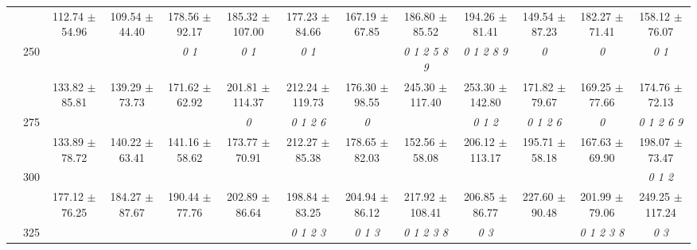 \begin{table}[h]
{\begin{tabular}{
        ccccccccccccc}
 & & \cellcolor[HTML]{EFEFEF} 112.74 $\pm$ 54.96& \cellcolor[HTML]{EFEFEF} 109.54 $\pm$ 44.40& \cellcolor[HTML]{EFEFEF} 178.56 $\pm$ 92.17& \cellcolor[HTML]{EFEFEF} 185.32 $\pm$ 107.00& \cellcolor[HTML]{EFEFEF} 177.23 $\pm$ 84.66& \cellcolor[HTML]{EFEFEF} 167.19 $\pm$ 67.85& \cellcolor[HTML]{EFEFEF} 186.80 $\pm$ 85.52& \cellcolor[HTML]{EFEFEF} 194.26 $\pm$ 81.41& \cellcolor[HTML]{EFEFEF} 149.54 $\pm$ 87.23& \cellcolor[HTML]{EFEFEF} 182.27 $\pm$ 71.41& \cellcolor[HTML]{EFEFEF} 158.12 $\pm$ 76.07 \\ 
 & \multirow{2}{*}{250}& & & \textit{ 0 1 }& \textit{ 0 1 }& \textit{ 0 1 }& & \textit{ 0 1 2 5 8 9 }& \textit{ 0 1 2 8 9 }& \textit{ 0 }& \textit{ 0 }& \textit{ 0 1 } \\ 
 & & 133.82 $\pm$ 85.81& 139.29 $\pm$ 73.73& 171.62 $\pm$ 62.92& 201.81 $\pm$ 114.37& 212.24 $\pm$ 119.73& 176.30 $\pm$ 98.55& 245.30 $\pm$ 117.40& 253.30 $\pm$ 142.80& 171.82 $\pm$ 79.67& 169.25 $\pm$ 77.66& 174.76 $\pm$ 72.13 \\ 
 & \multirow{2}{*}{275}& \cellcolor[HTML]{EFEFEF} & \cellcolor[HTML]{EFEFEF} & \cellcolor[HTML]{EFEFEF} & \cellcolor[HTML]{EFEFEF} \textit{ 0 }& \cellcolor[HTML]{EFEFEF} \textit{ 0 1 2 6 }& \cellcolor[HTML]{EFEFEF} \textit{ 0 }& \cellcolor[HTML]{EFEFEF} & \cellcolor[HTML]{EFEFEF} \textit{ 0 1 2 }& \cellcolor[HTML]{EFEFEF} \textit{ 0 1 2 6 }& \cellcolor[HTML]{EFEFEF} \textit{ 0 }& \cellcolor[HTML]{EFEFEF} \textit{ 0 1 2 6 9 } \\ 
 & & \cellcolor[HTML]{EFEFEF} 133.89 $\pm$ 78.72& \cellcolor[HTML]{EFEFEF} 140.22 $\pm$ 63.41& \cellcolor[HTML]{EFEFEF} 141.16 $\pm$ 58.62& \cellcolor[HTML]{EFEFEF} 173.77 $\pm$ 70.91& \cellcolor[HTML]{EFEFEF} 212.27 $\pm$ 85.38& \cellcolor[HTML]{EFEFEF} 178.65 $\pm$ 82.03& \cellcolor[HTML]{EFEFEF} 152.56 $\pm$ 58.08& \cellcolor[HTML]{EFEFEF} 206.12 $\pm$ 113.17& \cellcolor[HTML]{EFEFEF} 195.71 $\pm$ 58.18& \cellcolor[HTML]{EFEFEF} 167.63 $\pm$ 69.90& \cellcolor[HTML]{EFEFEF} 198.07 $\pm$ 73.47 \\ 
 & \multirow{2}{*}{300}& & & & & & & & & & & \textit{ 0 1 2 } \\ 
 & & 177.12 $\pm$ 76.25& 184.27 $\pm$ 87.67& 190.44 $\pm$ 77.76& 202.89 $\pm$ 86.64& 198.84 $\pm$ 83.25& 204.94 $\pm$ 86.12& 217.92 $\pm$ 108.41& 206.85 $\pm$ 86.77& 227.60 $\pm$ 90.48& 201.99 $\pm$ 79.06& 249.25 $\pm$ 117.24 \\ 
 & \multirow{2}{*}{325}& \cellcolor[HTML]{EFEFEF} & \cellcolor[HTML]{EFEFEF} & \cellcolor[HTML]{EFEFEF} & \cellcolor[HTML]{EFEFEF} & \cellcolor[HTML]{EFEFEF} \textit{ 0 1 2 3 }& \cellcolor[HTML]{EFEFEF} \textit{ 0 1 3 }& \cellcolor[HTML]{EFEFEF} \textit{ 0 1 2 3 8 }& \cellcolor[HTML]{EFEFEF} \textit{ 0 3 }& \cellcolor[HTML]{EFEFEF} & \cellcolor[HTML]{EFEFEF} \textit{ 0 1 2 3 8 }& \cellcolor[HTML]{EFEFEF} \textit{ 0 3 } \\ 

\end{tabular}}
\end{table}

